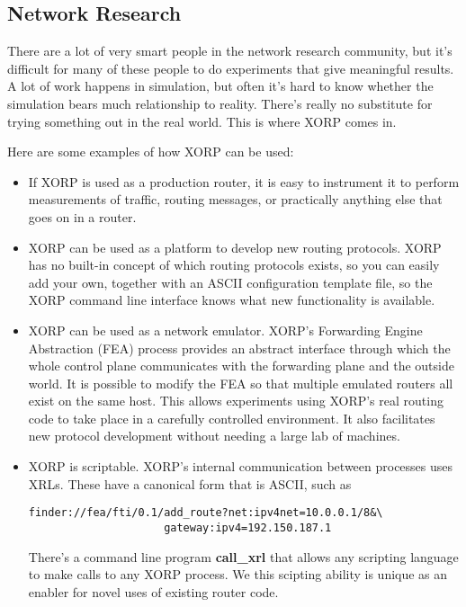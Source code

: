 \subsection{Network Research}

There are a lot of very smart people in the network research
community, but it's difficult for many of these people to do experiments
that give meaningful results.  A lot of work happens in simulation,
but often it's hard to know whether the simulation bears much
relationship to reality.  There's really no substitute for trying
something out in the real world.  This is where XORP comes in.

Here are some examples of how XORP can be used:

\begin{itemize}
\item If XORP is used as a production router, it is easy to instrument
it to perform measurements of traffic, routing messages, or
practically anything else that goes on in a router.  

\item XORP can be used as a platform to develop new routing protocols.
XORP has no built-in concept of which routing protocols exists, so you
can easily add your own, together with an ASCII configuration template
file, so the XORP command line interface knows what new
functionality is available.

\item XORP can be used as a network emulator.
XORP's Forwarding Engine Abstraction (FEA) process provides an
abstract interface through which the whole control plane communicates
with the forwarding plane and the outside world.  It is possible to
modify the FEA so that multiple emulated routers all exist on the same
host.  This allows experiments using XORP's real routing code to take
place in a carefully controlled environment.  It also facilitates new
protocol development without needing a large lab of machines.

\item XORP is scriptable.  XORP's internal communication between
processes uses XRLs.
These have a canonical form that is ASCII, such as 
\vspace{-0.1in}
\begin{verbatim}
finder://fea/fti/0.1/add_route?net:ipv4net=10.0.0.1/8&\
                     gateway:ipv4=192.150.187.1
\end{verbatim}
\vspace{-0.1in} There's a command line program \textbf{call\_xrl} that
allows any scripting language to make calls to any XORP process.  We
this scipting ability is unique as an enabler for novel uses of
existing router code.
\end{itemize}

